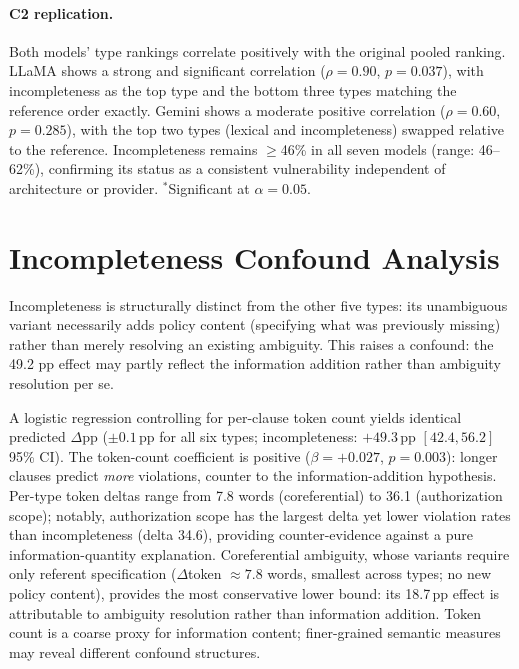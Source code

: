 \paragraph{C2 replication.} Both models' type rankings correlate positively with the original pooled ranking. LLaMA shows a strong and significant correlation ($\rho = 0.90$, $p = 0.037$), with incompleteness as the top type and the bottom three types matching the reference order exactly. Gemini shows a moderate positive correlation ($\rho = 0.60$, $p = 0.285$), with the top two types (lexical and incompleteness) swapped relative to the reference. Incompleteness remains $\geq$46\% in all seven models (range: 46--62\%), confirming its status as a consistent vulnerability independent of architecture or provider. $^*$Significant at $\alpha = 0.05$.

\section{Incompleteness Confound Analysis}
\label{app:confound}

Incompleteness is structurally distinct from the other five types: its unambiguous variant necessarily adds policy content (specifying what was previously missing) rather than merely resolving an existing ambiguity. This raises a confound: the 49.2 pp effect may partly reflect the information addition rather than ambiguity resolution per se.

A logistic regression controlling for per-clause token count yields identical predicted $\Delta$pp ($\pm 0.1$\,pp for all six types; incompleteness: $+49.3$\,pp $[42.4, 56.2]$ 95\% CI). The token-count coefficient is positive ($\beta = +0.027$, $p = 0.003$): longer clauses predict \emph{more} violations, counter to the information-addition hypothesis. Per-type token deltas range from 7.8 words (coreferential) to 36.1 (authorization scope); notably, authorization scope has the largest delta yet lower violation rates than incompleteness (delta 34.6), providing counter-evidence against a pure information-quantity explanation. Coreferential ambiguity, whose variants require only referent specification ($\Delta$token $\approx 7.8$ words, smallest across types; no new policy content), provides the most conservative lower bound: its 18.7\,pp effect is attributable to ambiguity resolution rather than information addition. Token count is a coarse proxy for information content; finer-grained semantic measures may reveal different confound structures.

